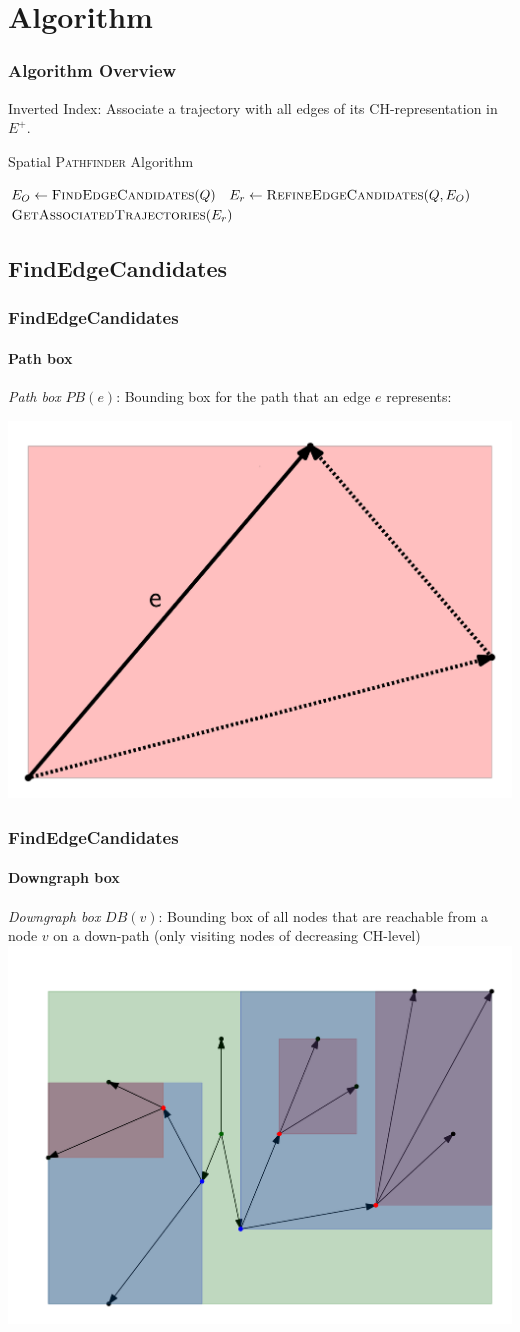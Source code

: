\documentclass{beamer}
\newcommand{\pathfinder}{\textsc{Pathfinder}\xspace}
\newcommand{\findEdgeCandidates}{FindEdgeCandidates\xspace}
\newcommand{\refineEdgeCandidates}{RefineEdgeCandidates\xspace}
\newcommand{\getAssociatedTrajectories}{GetAssociatedTrajectories\xspace}
\newcommand{\chrep}{CH-representation\xspace}
\begin{document}
\section{Algorithm}

\begin{frame}
	\frametitle{Algorithm Overview}
	Inverted Index: Associate a trajectory with all edges of its \chrep in $E^+$.
	\begin{algorithm}[H]
		\renewcommand{\thealgorithm}{}
		{\small
			\caption{Spatial \pathfinder Algorithm}
			\begin{algorithmic}[1]
				 \pause
				\State $E_O \gets \Call{\findEdgeCandidates}{Q}$ \label{line:edge_revrieval} \pause
				\State $E_r \gets \Call{\refineEdgeCandidates}{Q, E_O}$ \pause
				\State \Return $\Call{\getAssociatedTrajectories}{E_r}$
				\EndProcedure
			\end{algorithmic}
			\label{alg:spatial_pathfinder}
		}
	\end{algorithm}
\end{frame}

\subsection{\findEdgeCandidates}
\begin{frame}
	\frametitle{\findEdgeCandidates}
	\framesubtitle{Path box}
	\emph{Path box} $PB(e)$: Bounding box for the path that an edge $e$ represents:

	\includegraphics[width=.5\columnwidth]{images/pathBox}
\end{frame}

\begin{frame}
	\frametitle{\findEdgeCandidates}
	\framesubtitle{Downgraph box}
	\emph{Downgraph box} $DB(v)$: Bounding box of all nodes that are reachable from a node $v$ on a down-path (only visiting nodes of decreasing CH-level)
	\includegraphics[width=.76\columnwidth]{images/downgraphBox}
\end{frame}
\end{document}
